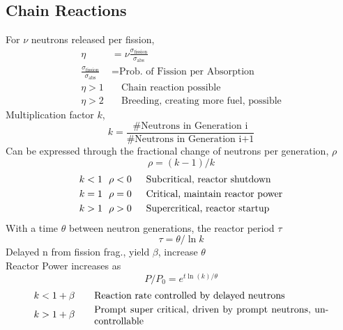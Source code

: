\subsection{Chain Reactions}
For $\nu$ neutrons released per fission,
\begin{align*}
\eta &= \nu \frac{\sigma_\text{fission}}{\sigma_\text{abs}} \\
\frac{\sigma_\text{fission}}{\sigma_\text{abs}} &= \text{Prob. of Fission per Absorption} \\
\eta > 1 & \quad \text{Chain reaction possible} \\
\eta > 2 & \quad \text{Breeding, creating more fuel, possible}
\end{align*}
Multiplication factor $k$,
\[
k = \frac{\text{\# Neutrons in Generation i}}{\text{\# Neutrons in Generation i+1}}
\]
Can be expressed through the fractional change of neutrons per generation, $\rho$
\[
\rho = (k-1)/k
\]
\begin{align*}
k < 1 & ~~ \rho < 0 & & \enskip \text{Subcritical, reactor shutdown} \\
k = 1 & ~~ \rho = 0 & & \enskip \text{Critical, maintain reactor power} \\
k > 1 & ~~ \rho > 0 & & \enskip \text{Supercritical, reactor startup} 
\end{align*}
With a time $\theta$ between neutron generations, the reactor period $\tau$
\[
\tau = \theta / \ln{k}
\]
Delayed n from fission frag., yield $\beta$, increase $\theta$ \\
Reactor Power increases as
\[
P / P_0 = e^{t \ln{(k)} / \theta}
\]
\begin{align*}
k < 1 + \beta & \qquad \parbox{0.7\linewidth}{Reaction rate controlled by delayed neutrons} \\
k > 1 + \beta & \qquad \parbox{0.7\linewidth}{Prompt super critical, driven by prompt neutrons, uncontrollable}
\end{align*}



